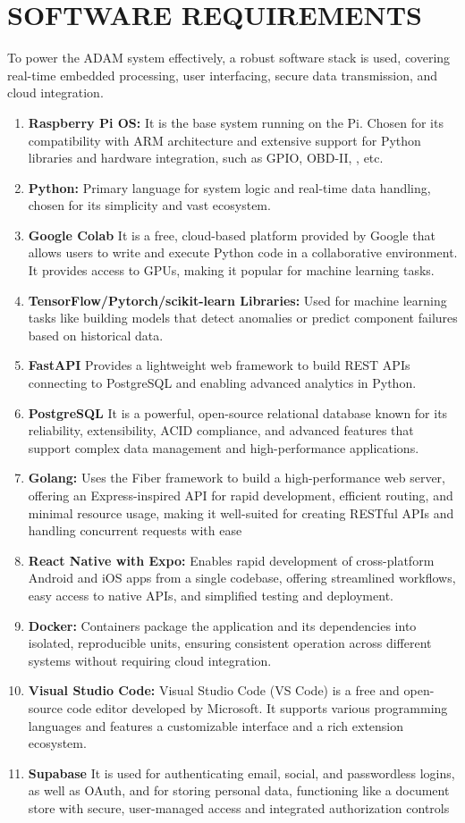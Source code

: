\section{SOFTWARE REQUIREMENTS}
To power the ADAM system effectively, a robust software stack is used, covering real-time embedded processing, user interfacing, secure data transmission, and cloud integration.
\begin{enumerate}
    \item \textbf{Raspberry Pi OS:}  It is the base system running on the Pi.  Chosen for its compatibility with ARM architecture and extensive support for Python libraries and hardware integration, such as GPIO, OBD-II, , etc.
    \item \textbf{Python:}  Primary language for system logic and real-time data handling, chosen for its simplicity and vast ecosystem.
    \item \textbf{Google Colab} It is a free, cloud-based platform provided by Google that allows users to write and execute Python code in a collaborative environment. It provides access to GPUs, making it popular for machine learning tasks. 
    \item \textbf{TensorFlow/Pytorch/scikit-learn Libraries:} Used for machine learning tasks like building models that detect anomalies or predict component failures based on historical data.
    \item \textbf{FastAPI} Provides a lightweight web framework to build REST APIs connecting to PostgreSQL and enabling advanced analytics in Python.
    \item \textbf{PostgreSQL} It is a powerful, open-source relational database known for its reliability, extensibility, ACID compliance, and advanced features that support complex data management and high-performance applications.
    \item \textbf{Golang:} Uses the Fiber framework to build a high-performance web server, offering an Express-inspired API for rapid development, efficient routing, and minimal resource usage, making it well-suited for creating RESTful APIs and handling concurrent requests with ease
    \item \textbf{React Native with Expo:} Enables rapid development of cross-platform Android and iOS apps from a single codebase, offering streamlined workflows, easy access to native APIs, and simplified testing and deployment.
    \item \textbf{Docker:} Containers package the application and its dependencies into isolated, reproducible units, ensuring consistent operation across different systems without requiring cloud integration.
    \item \textbf{Visual Studio Code:} Visual Studio Code (VS Code) is a free and open-source code editor developed by Microsoft. It supports various programming languages and features a customizable interface and a rich extension ecosystem.
    \item \textbf{Supabase}  It is used for authenticating email, social, and passwordless logins, as well as OAuth, and for storing personal data, functioning like a document store with secure, user-managed access and integrated authorization controls
\end{enumerate}

